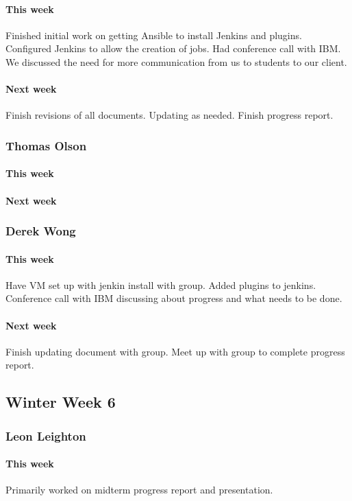 \documentclass[10pt,letterpaper,onecolumn,draftclsnofoot]{IEEEtran}
\begin{document}
\paragraph{This week}Finished initial work on getting Ansible to install Jenkins and plugins.  
Configured Jenkins to allow the creation of jobs.  
Had conference call with IBM. We discussed the need for more communication from us to students to our client.
\paragraph{Next week}Finish revisions of all documents. Updating as needed.  
Finish progress report.


\subsubsection{Thomas Olson}
\paragraph{This week}
\paragraph{Next week}


\subsubsection{Derek Wong}
\paragraph{This week}Have VM set up with jenkin install with group.       
Added plugins to jenkins.      
Conference call with IBM discussing about progress and what needs to be done. 
\paragraph{Next week}Finish updating document with group.       
Meet up with group to complete progress report.


\subsection{Winter Week 6}
\subsubsection{Leon Leighton}
\paragraph{This week}Primarily worked on midterm progress report and presentation.
\end{document}

